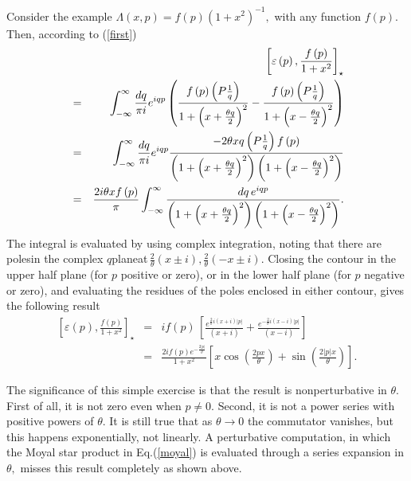 \documentclass[a4paper,12pt]{article}
\begin{document}
Consider the example $\Lambda \left( x,p\right) =f\left( p\right) \left(
1+x^{2}\right) ^{-1},$ with any function $f\left( p\right) $. Then,
according to (\ref{first})
\begin{eqnarray}
&&\left[ \varepsilon \left( p\right) ,\frac{f\left( p\right) }{1+x^{2}}%
\right] _{\star } \\
&=&\int_{-\infty }^{\infty }\frac{dq}{\pi i}e^{iqp}\left( \frac{f\left(
p\right) \left( P\frac{1}{q}\right) }{1+\left( x+\frac{\theta q}{2}\right)
^{2}}-\frac{f\left( p\right) \left( P\frac{1}{q}\right) }{1+\left( x-\frac{%
\theta q}{2}\right) ^{2}}\right) \\
&=&\int_{-\infty }^{\infty }\frac{dq}{\pi i}e^{iqp}\frac{-2\theta xq\left( P%
\frac{1}{q}\right) f\left( p\right) }{\left( 1+\left( x+\frac{\theta q}{2}%
\right) ^{2}\right) \left( 1+\left( x-\frac{\theta q}{2}\right) ^{2}\right) }
\\
&=&\frac{2i\theta xf\left( p\right) }{\pi }\int_{-\infty }^{\infty }\frac{%
dq\,e^{iqp}}{\left( 1+\left( x+\frac{\theta q}{2}\right) ^{2}\right) \left(
1+\left( x-\frac{\theta q}{2}\right) ^{2}\right) }.
\end{eqnarray}
The integral is evaluated by using complex integration, noting that there
are poles\thinspace in the complex $q$\thinspace plane\thinspace at$\,\frac{2%
}{\theta }\left( x\pm i\right) ,\frac{2}{\theta }\left( -x\pm i\right) .$
Closing the contour in the upper half plane (for $p$ positive or zero), or
in the lower half plane (for $p$ negative or zero), and evaluating the
residues of the poles enclosed in either contour, gives the following result
\begin{eqnarray}
\left[ \varepsilon \left( p\right) ,\frac{f\left( p\right) }{1+x^{2}}\right]
_{\star } &=&if\left( p\right) \,\left[ \frac{e^{\frac{2}{\theta }i\left(
x+i\right) \left| p\right| }}{\left( x+i\right) }+\frac{e^{-\frac{2}{\theta }%
i\left( x-i\right) \left| p\right| }}{\left( x-i\right) }\right] \\
&=&\frac{2if\left( p\right) e^{-\frac{2\left| p\right| }{\theta }}}{1+x^{2}}%
\left[ x\cos \left( \frac{2px}{\theta }\right) +\sin \left( \frac{2\left|
p\right| x}{\theta }\right) \right] .
\end{eqnarray}

The significance of this simple exercise is that the result is
nonperturbative in $\theta .$ First of all, it is not zero even when $p\neq
0.$ Second, it is not a power series with positive powers of $\theta .$ It
is still true that as $\theta \rightarrow 0$ the commutator vanishes, but
this happens exponentially, not linearly. A perturbative computation, in
which the Moyal star product in Eq.(\ref{moyal}) is evaluated through a
series expansion in $\theta ,$ misses this result completely as shown above.
\end{document}
